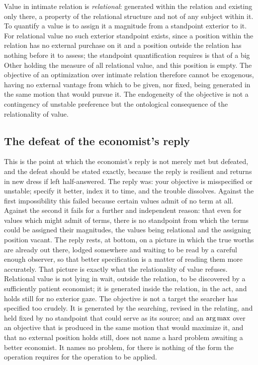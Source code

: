 \begin{claim}
Value in intimate relation is \emph{relational}: generated within the relation and existing only there, a property of the relational structure and not of any subject within it. To quantify a value is to assign it a magnitude from a standpoint exterior to it. For relational value no such exterior standpoint exists, since a position within the relation has no external purchase on it and a position outside the relation has nothing before it to assess; the standpoint quantification requires is that of a big Other holding the measure of all relational value, and this position is empty. The objective of an optimization over intimate relation therefore cannot be exogenous, having no external vantage from which to be given, nor fixed, being generated in the same motion that would pursue it. The endogeneity of the objective is not a contingency of unstable preference but the ontological consequence of the relationality of value.
\end{claim}

\subsection*{The defeat of the economist's reply}

This is the point at which the economist's reply is not merely met but defeated, and the defeat should be stated exactly, because the reply is resilient and returns in new dress if left half-answered. The reply was: your objective is misspecified or unstable; specify it better, index it to time, and the trouble dissolves. Against the first impossibility this failed because certain values admit of no term at all. Against the second it fails for a further and independent reason: that even for values which might admit of terms, there is no standpoint from which the terms could be assigned their magnitudes, the values being relational and the assigning position vacant. The reply rests, at bottom, on a picture in which the true worths are already out there, lodged somewhere and waiting to be read by a careful enough observer, so that better specification is a matter of reading them more accurately. That picture is exactly what the relationality of value refuses. Relational value is not lying in wait, outside the relation, to be discovered by a sufficiently patient economist; it is generated inside the relation, in the act, and holds still for no exterior gaze. The objective is not a target the searcher has specified too crudely. It is generated by the searching, revised in the relating, and held fixed by no standpoint that could serve as its source; and an $\operatorname*{arg\,max}$ over an objective that is produced in the same motion that would maximize it, and that no external position holds still, does not name a hard problem awaiting a better economist. It names no problem, for there is nothing of the form the operation requires for the operation to be applied.
